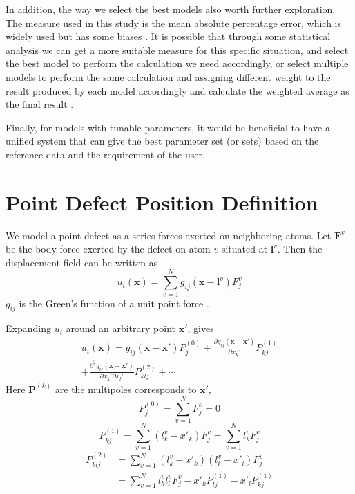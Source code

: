 \documentclass[%
 reprint,
 amsmath,amssymb,
 aps,
]{revtex4-1}
\begin{document}
In addition, the way we select the best models also worth further exploration.
The measure used in this study is the mean absolute percentage error, which is widely used but has some biases \cite{mayer1993statistical}.
It is possible that through some statistical analysis we can get a more suitable measure for this specific situation, and select the best model to perform the calculation we need accordingly, or select multiple models to perform the same calculation and assigning different weight to the result produced by each model accordingly and calculate the weighted average as the final result \cite{frederiksen2004bayesian}.

Finally, for models with tunable parameters, it would be beneficial to have a unified system that can give the best parameter set (or sets) based on the reference data and the requirement of the user.
%

\appendix
\section{Point Defect Position Definition}
\label{app:position}
We model a point defect as a series forces exerted on neighboring atoms.
Let $\bm{F}^{v}$ be the body force exerted by the defect on atom $v$ situated at $\bm{l}^v$.
Then the displacement field can be written as
\begin{equation}
u_i(\bm{x}) = \sum_{v=1}^{N} g_{ij}(\bm{x}-\bm{l}^v) F_j^v
\end{equation}
$g_{ij}$ is the Green's function of a unit point force \cite{seifmultipolar,ting1997three}.

Expanding $u_i$ around an arbitrary point $\bm{x'}$, gives
\begin{multline}
u_i(\bm{x})
= g_{ij}(\bm{x}-\bm{x'}) P_j^{(0)}
 + \frac{\partial g_{ij}(\bm{x}-\bm{x'})}{\partial x_k'} P_{kj}^{(1)}\\
 + \frac{\partial^2 g_{ij}(\bm{x}-\bm{x'})}{\partial x_k' \partial x_l'} P_{klj}^{(2)}
 + \cdots
\end{multline}
Here $\bm{P}^{(k)}$ are the multipoles corresponds to $\bm{x'}$,
\begin{equation}
  P_j^{(0)} = \sum_{v=1}^N F_j^v = 0
\end{equation}
\begin{equation}
  P_{kj}^{(1)} = \sum_{v=1}^N (l_k^v-x'_k) F_j^v = \sum_{v=1}^N l_k^v F_j^v
\end{equation}
\begin{align}
  P_{klj}^{(2)} & = \sum_{v=1}^N (l_k^v-x'_k) (l_l^v-x'_l) F_j^v \nonumber \\
  & = \sum_{v=1}^N l_k^vl_l^v F_j^v - x'_k P_{lj}^{(1)} - x'_l P_{kj}^{(1)}
\end{align}
\end{document}

